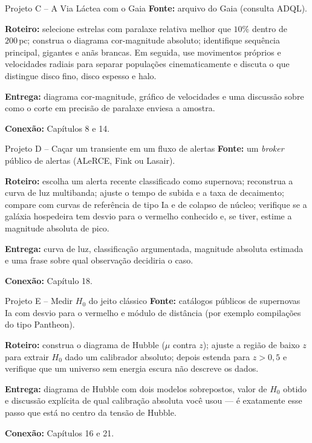 \documentclass[11pt,a4paper]{article}
\begin{document}
\begin{lessonblock}{Projeto C -- A Via Láctea com o Gaia}
\textbf{Fonte:} arquivo do Gaia (consulta ADQL).

\textbf{Roteiro:} selecione estrelas com paralaxe relativa melhor que $10\%$ dentro de $200\,\mathrm{pc}$; construa o diagrama cor-magnitude absoluto; identifique sequência principal, gigantes e anãs brancas. Em seguida, use movimentos próprios e velocidades radiais para separar populações cinematicamente e discuta o que distingue disco fino, disco espesso e halo.

\textbf{Entrega:} diagrama cor-magnitude, gráfico de velocidades e uma discussão sobre como o corte em precisão de paralaxe enviesa a amostra.

\textbf{Conexão:} Capítulos 8 e 14.
\end{lessonblock}

\begin{lessonblock}{Projeto D -- Caçar um transiente em um fluxo de alertas}
\textbf{Fonte:} um \textit{broker} público de alertas (ALeRCE, Fink ou Lasair).

\textbf{Roteiro:} escolha um alerta recente classificado como supernova; reconstrua a curva de luz multibanda; ajuste o tempo de subida e a taxa de decaimento; compare com curvas de referência de tipo Ia e de colapso de núcleo; verifique se a galáxia hospedeira tem desvio para o vermelho conhecido e, se tiver, estime a magnitude absoluta de pico.

\textbf{Entrega:} curva de luz, classificação argumentada, magnitude absoluta estimada e uma frase sobre qual observação decidiria o caso.

\textbf{Conexão:} Capítulo 18.
\end{lessonblock}

\begin{lessonblock}{Projeto E -- Medir $H_0$ do jeito clássico}
\textbf{Fonte:} catálogos públicos de supernovas Ia com desvio para o vermelho e módulo de distância (por exemplo compilações do tipo Pantheon).

\textbf{Roteiro:} construa o diagrama de Hubble ($\mu$ contra $z$); ajuste a região de baixo $z$ para extrair $H_0$ dado um calibrador absoluto; depois estenda para $z>0{,}5$ e verifique que um universo sem energia escura não descreve os dados.

\textbf{Entrega:} diagrama de Hubble com dois modelos sobrepostos, valor de $H_0$ obtido e discussão explícita de qual calibração absoluta você usou --- é exatamente esse passo que está no centro da tensão de Hubble.

\textbf{Conexão:} Capítulos 16 e 21.
\end{lessonblock}
\end{document}
